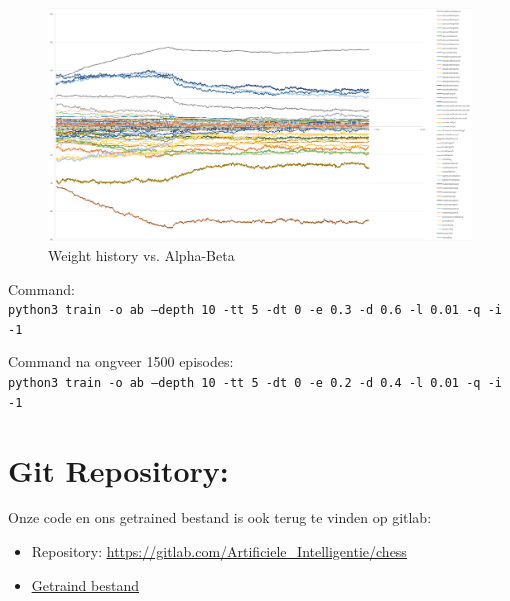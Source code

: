 \documentclass[a4paper,openany]{uantwerpenassignment}
\newcommand{\codeword}[1]{
    \colorbox{code}{\texttt{\textcolor{codetext}{#1}}}
}
\begin{document}
\begin{figure}[h]
    \centering
    \includegraphics[width=\textwidth]{images/ab.png}
    \caption{Weight history vs. Alpha-Beta}
    \label{fig:ab}
\end {figure}

Command:\\
\codeword{python3 train -o ab --depth 10 -tt 5 -dt 0 -e 0.3 -d 0.6 -l 0.01 -q -i -1}

Command na ongveer 1500 episodes:\\
\codeword{python3 train -o ab --depth 10 -tt 5 -dt 0 -e 0.2 -d 0.4 -l 0.01 -q -i -1}

\section{Git Repository:}
Onze code en ons getrained bestand is ook terug te vinden op gitlab: 
\begin{itemize}
    \item Repository: \href{https://gitlab.com/Artificiele_Intelligentie/chess}{\color{blue}\underline{https://gitlab.com/Artificiele\_Intelligentie/chess}}
    \item \href{https://gitlab.com/Artificiele_Intelligentie/chess/-/raw/master/grandQ.json}{\color{blue}\underline{Getraind bestand}}
\end{itemize}



\end{document}
